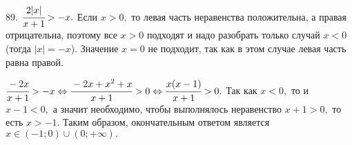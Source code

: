 89.  $\cfrac{2|x|}{x+1}>-x.$ Если $x>0,$ то левая часть неравенства положительна, а правая отрицательна, поэтому все $x>0$ подходят и надо разобрать только случай $x<0$ (тогда $|x|=-x$). Значение $x=0$ не подходит, так как в этом случае левая часть равна правой.

$\cfrac{-2x}{x+1}>-x\Leftrightarrow \cfrac{-2x+x^2+x}{x+1}>0\Leftrightarrow \cfrac{x(x-1)}{x+1}>0.$ Так как $x<0,$ то и $x-1<0,$ а значит необходимо, чтобы выполнялось неравенство $x+1>0,$ то есть $x>-1.$ Таким образом, окончательным ответом является $x\in(-1;0)\cup (0;+\infty).$\\
